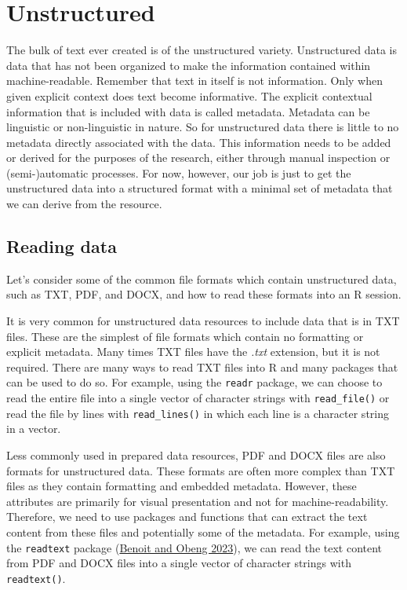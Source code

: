 \documentclass[
  letterpaper,
  DIV=11,
  numbers=noendperiod]{scrreport}
\theoremstyle{definition}
\theoremstyle{remark}
\begin{document}
\hypertarget{unstructured}{%
\section{Unstructured}\label{unstructured}}

The bulk of text ever created is of the unstructured variety.
Unstructured data is data that has not been organized to make the
information contained within machine-readable. Remember that text in
itself is not information. Only when given explicit context does text
become informative. The explicit contextual information that is included
with data is called metadata. Metadata can be linguistic or
non-linguistic in nature. So for unstructured data there is little to no
metadata directly associated with the data. This information needs to be
added or derived for the purposes of the research, either through manual
inspection or (semi-)automatic processes. For now, however, our job is
just to get the unstructured data into a structured format with a
minimal set of metadata that we can derive from the resource.

\hypertarget{reading-data}{%
\subsection{Reading data}\label{reading-data}}

Let's consider some of the common file formats which contain
unstructured data, such as TXT, PDF, and DOCX, and how to read these
formats into an R session.

It is very common for unstructured data resources to include data that
is in TXT files. These are the simplest of file formats which contain no
formatting or explicit metadata. Many times TXT files have the
\emph{.txt} extension, but it is not required. There are many ways to
read TXT files into R and many packages that can be used to do so. For
example, using the \texttt{readr} package, we can choose to read the
entire file into a single vector of character strings with
\texttt{read\_file()} or read the file by lines with
\texttt{read\_lines()} in which each line is a character string in a
vector.

Less commonly used in prepared data resources, PDF and DOCX files are
also formats for unstructured data. These formats are often more complex
than TXT files as they contain formatting and embedded metadata.
However, these attributes are primarily for visual presentation and not
for machine-readability. Therefore, we need to use packages and
functions that can extract the text content from these files and
potentially some of the metadata. For example, using the
\texttt{readtext} package (\protect\hyperlink{ref-R-readtext}{Benoit and
Obeng 2023}), we can read the text content from PDF and DOCX files into
a single vector of character strings with \texttt{readtext()}.
\end{document}
